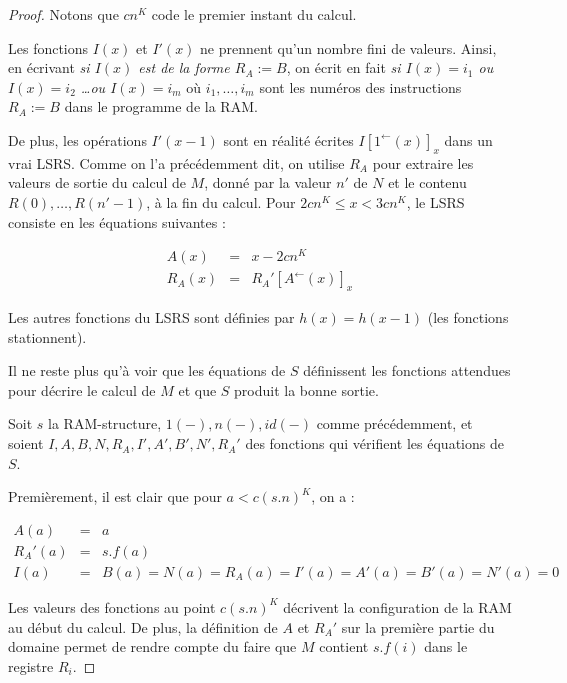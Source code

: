 \documentclass{article}
\newcommand{\eqpred}[3]{#1\left[ #2^{\leftarrow}(#3) \right]_{#3}}
\begin{document}
\begin{proof}
{\begin{minipage}{0.9\textwidth}
				\end{minipage}
				}
			
			\espace 
			
			Notons que $cn^K$ code le premier instant du calcul. 
			
			Les fonctions $I(x)$ et $I'(x)$ ne prennent qu'un nombre fini de valeurs. Ainsi, en écrivant \emph{si $I(x)$ est de la forme $R_A := B$}, on écrit en fait \emph{si $I(x) = i_1$ ou $I(x) = i_2$ \dots ou $I(x) = i_m$} où $i_1, \dots, i_m$ sont les numéros des instructions $R_A := B$ dans le programme de la RAM.
			
			De plus, les opérations $I'(x-1)$ sont en réalité écrites $\eqpred{I}{1}{x}$ dans un vrai LSRS. Comme on l'a précédemment dit, on utilise $R_A$ pour extraire les valeurs de sortie du calcul de $M$, donné par la valeur $n'$ de $N$ et le contenu $R(0), \dots, R(n'-1)$, à la fin du calcul. Pour $2cn^K \leqslant x < 3cn^K$, le LSRS consiste en les équations suivantes :
			
			\setcounter{equation}{0}
			\begin{eqnarray}
				A(x) & = & x - 2cn^K \\
				R_A(x) & = & \eqpred{R_A'}{A}{x}
			\end{eqnarray}
			
			Les autres fonctions du LSRS sont définies par $h(x) = h(x-1)$ (les fonctions stationnent).
			
			Il ne reste plus qu'à voir que les équations de $S$ définissent les fonctions attendues pour décrire le calcul de $M$ et que $S$ produit la bonne sortie.
			
			Soit $s$ la RAM-structure, $1(-), n(-), id(-)$ \footnotemark comme précédemment, et soient $I, A, B, N, R_A, I', A', B', N', R_A'$ des fonctions qui vérifient les équations de $S$.
				
			Premièrement, il est clair que pour $a < c(s.n)^K$, on a :
			
			\setcounter{equation}{0}
			\begin{eqnarray}
				A(a) & = & a \\
				R_A'(a) & = & s.f(a) \\
				I(a) & = & B(a) = N(a) = R_A(a) = I'(a) = A'(a) = B'(a) = N'(a) = 0
			\end{eqnarray}
			
			Les valeurs des fonctions au point $c(s.n)^K$ décrivent la configuration de la RAM au début du calcul. De plus, la définition de $A$ et $R_A'$ sur la première partie du domaine permet de rendre compte du faire que $M$ contient $s.f(i)$ dans le registre $R_i$.
			

\end{proof}
\end{document}
